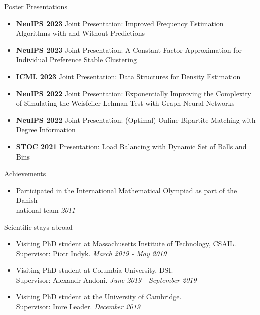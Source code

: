 \documentclass{resume} %
\begin{document}
  \begin{rSection}{Poster Presentations}
 \begin{itemize}
  \item  \textbf{NeuIPS 2023} Joint Presentation: Improved Frequency Estimation Algorithms with and Without Predictions
  \item  \textbf{NeuIPS 2023} Joint Presentation: A Constant-Factor Approximation for Individual Preference Stable Clustering
  \item  \textbf{ICML 2023} Joint Presentation: Data Structures for Density Estimation
  \item  \textbf{NeuIPS 2022} Joint Presentation: Exponentially Improving the Complexity of Simulating the Weisfeiler-Lehman Test with
Graph Neural Networks
  \item  \textbf{NeuIPS 2022} Joint Presentation: (Optimal) Online Bipartite Matching with Degree Information
  \item  \textbf{STOC 2021} Presentation: Load Balancing with Dynamic Set of Balls and Bins
 \end{itemize}
 \end{rSection}


\begin{rSection}{Achievements}
\begin{itemize}
\item Participated in the International Mathematical Olympiad as part of the Danish \\ national team  \hfill{\emph{2011}}
\end{itemize}
\end{rSection}


\begin{rSection}{Scientific stays abroad}
\begin{itemize}
\item Visiting PhD student at Massachusetts Institute of Technology, CSAIL. \\Supervisor: Piotr Indyk. \hfill{\emph{March 2019 - May 2019}}
\item Visiting PhD student at Columbia University, DSI. \\ Supervisor: Alexandr Andoni. \hfill{\emph{June 2019 - September 2019}}
\item Visiting PhD student at the University of Cambridge.  \\Supervisor: Imre Leader. \hfill{\emph{December 2019}}
\end{itemize}

\end{rSection}
\end{document}
